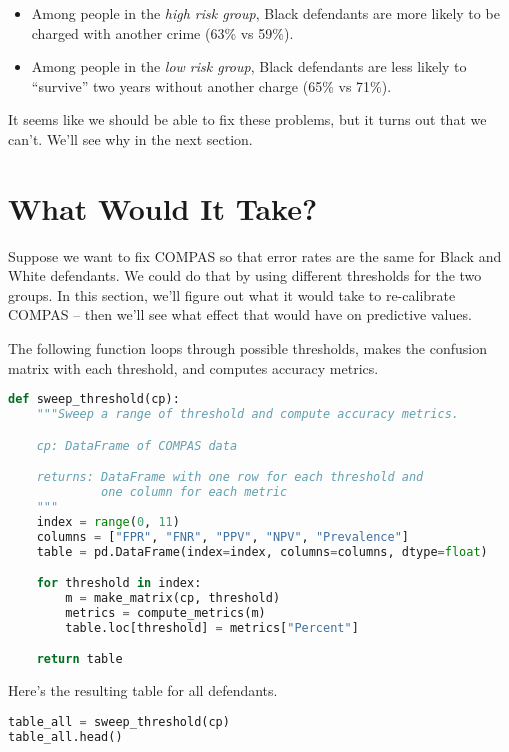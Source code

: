 \begin{itemize}
\item
  Among people in the \emph{high risk group}, Black defendants are more
  likely to be charged with another crime (63\% vs 59\%).
\item
  Among people in the \emph{low risk group}, Black defendants are less
  likely to ``survive'' two years without another charge (65\% vs 71\%).
\end{itemize}

It seems like we should be able to fix these problems, but it turns out
that we can't. We'll see why in the next section.

\section{What Would It Take?}\label{what-would-it-take}

Suppose we want to fix COMPAS so that error rates are the same for Black
and White defendants. We could do that by using different thresholds for
the two groups. In this section, we'll figure out what it would take to
re-calibrate COMPAS -- then we'll see what effect that would have on
predictive values.

The following function loops through possible thresholds, makes the
confusion matrix with each threshold, and computes accuracy metrics.

\begin{lstlisting}[language=Python,style=source]
def sweep_threshold(cp):
    """Sweep a range of threshold and compute accuracy metrics.

    cp: DataFrame of COMPAS data

    returns: DataFrame with one row for each threshold and
             one column for each metric
    """
    index = range(0, 11)
    columns = ["FPR", "FNR", "PPV", "NPV", "Prevalence"]
    table = pd.DataFrame(index=index, columns=columns, dtype=float)

    for threshold in index:
        m = make_matrix(cp, threshold)
        metrics = compute_metrics(m)
        table.loc[threshold] = metrics["Percent"]

    return table
\end{lstlisting}

Here's the resulting table for all defendants.

\begin{lstlisting}[language=Python,style=source]
table_all = sweep_threshold(cp)
table_all.head()
\end{lstlisting}

